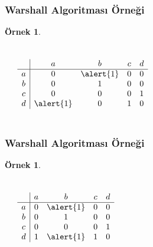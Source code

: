 \documentclass[dvipsnames]{beamer}
\theoremstyle{definition}
\theoremstyle{example}
\newtheorem{ornek}[theorem]{Örnek}
\theoremstyle{plain}
\begin{document}
\begin{frame}
  \frametitle{Warshall Algoritması Örneği}

  \begin{ornek}
    \begin{columns}
      \begin{center}
      \end{center}

      \[
        \begin{array}{c|cccc}
              & a & b & c & d\\\hline
            a & 0 & \alert{1} & 0 & 0\\
            b & 0 & 1 & 0 & 0\\
            c & 0 & 0 & 0 & 1\\
            d & \alert{1} & 0 & 1 & 0
        \end{array}
      \]
    \end{columns}
  \end{ornek}
\end{frame}

\begin{frame}
  \frametitle{Warshall Algoritması Örneği}

  \begin{ornek}
    \begin{columns}
      \begin{center}
      \end{center}

      \[
        \begin{array}{c|cccc}
              & a & b & c & d\\\hline
            a & 0 & \alert{1} & 0 & 0\\
            b & 0 & 1 & 0 & 0\\
            c & 0 & 0 & 0 & 1\\
            d & 1 & \alert{1} & 1 & 0
        \end{array}
      \]
    \end{columns}
  \end{ornek}
\end{frame}
\end{document}
